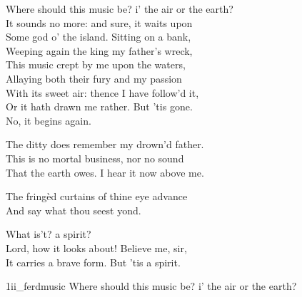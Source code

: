 \begin{verse_speech}[Ferdinand] 
Where should this music be? i' the air or the earth?\\
It sounds no more: and sure, it waits upon\\
Some god o' the island. Sitting on a bank,\\
Weeping again the king my father's wreck,\\
This music crept by me upon the waters,\\
Allaying both their fury and my passion\\
With its sweet air: thence I have follow'd it,\\
Or it hath drawn me rather. But 'tis gone.\\
No, it begins again.
\begin{song}
\end{song}
\end{verse_speech}


\begin{verse_speech}[Ferdinand] 
The ditty does remember my drown'd father.\\
This is no mortal business, nor no sound\\
That the earth owes. I hear it now above me.\\
\end{verse_speech}

\begin{verse_speech}[Prospero] 
The fringèd curtains of thine eye advance\\
And say what thou seest yond.
\end{verse_speech}

\begin{verse_speech}[Miranda] 
What is't? a spirit?\\
Lord, how it looks about! Believe me, sir,\\
It carries a brave form. But 'tis a spirit.
\end{verse_speech}


\begin{pictures} %
	\begin{a4}
		\begin{colorbigpic}
			[1.0]
			{1ii_ferdmusic}
			{Where should this music be? i' the air or the earth?}
		\end{colorbigpic}
	\end{a4}
\end{pictures}
	


